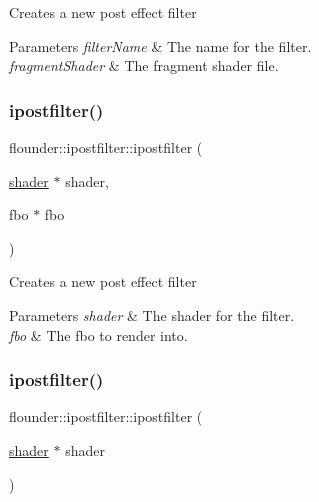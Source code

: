 Creates a new post effect filter 


\begin{DoxyParams}{Parameters}
{\em filter\+Name} & The name for the filter. \\
\hline
{\em fragment\+Shader} & The fragment shader file. \\
\hline
\end{DoxyParams}
\mbox{\label{classflounder_1_1ipostfilter_a45622b81739ebad815b69526a878b054}} 
\subsubsection{\texorpdfstring{ipostfilter()}{ipostfilter()}\hspace{0.1cm}{\footnotesize\ttfamily [3/4]}}
{\footnotesize\ttfamily flounder\+::ipostfilter\+::ipostfilter (\begin{DoxyParamCaption}\item[{\hyperlink{classflounder_1_1shader}{shader} $\ast$}]{shader,  }\item[{fbo $\ast$}]{fbo }\end{DoxyParamCaption})}



Creates a new post effect filter 


\begin{DoxyParams}{Parameters}
{\em shader} & The shader for the filter. \\
\hline
{\em fbo} & The fbo to render into. \\
\hline
\end{DoxyParams}
\mbox{\label{classflounder_1_1ipostfilter_a90d67fde6f8fe6ff4e3a7dba0fab418d}} 
\subsubsection{\texorpdfstring{ipostfilter()}{ipostfilter()}\hspace{0.1cm}{\footnotesize\ttfamily [4/4]}}
{\footnotesize\ttfamily flounder\+::ipostfilter\+::ipostfilter (\begin{DoxyParamCaption}\item[{\hyperlink{classflounder_1_1shader}{shader} $\ast$}]{shader }\end{DoxyParamCaption})}



